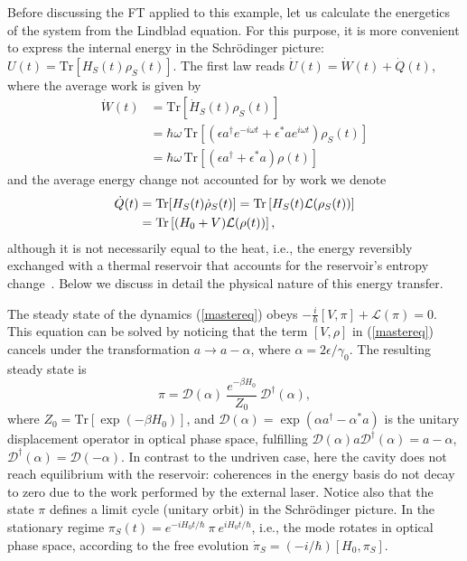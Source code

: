 \documentclass[aps,prx,twocolumn,showpacs,floatfix,superscriptaddress,graphics,longbibliography]{revtex4-1}
\newcommand{\tr}{\mathrm{Tr}}
\begin{document}
Before discussing the FT applied to this example, let us calculate the energetics of the system from the Lindblad equation. For this purpose, it is more convenient to express the internal energy in the Schr\"odinger picture: $U(t)=\tr[H_S(t)\rho_S(t)]$. The first law reads $\dot U(t)=\dot W(t)+\dot Q(t)$, where the average work is given by 
\begin{align}
\dot{W}(t) &= \tr[\dot{H}_S(t) \rho_S(t)] \nonumber \\ 
 & = \hbar\omega \, \tr\left[ \left(\epsilon  a^\dagger e^{-i\omega t} + \epsilon^*ae^{i\omega t} \right)\rho_S(t)\right] \nonumber \\
& = \hbar\omega\, \tr\left[ \left(\epsilon  a^\dagger  + \epsilon^*a \right)\rho(t)\right]
\end{align}
and the average energy change not accounted for by work we denote
\begin{align}
\dot{Q}(t) & =  \tr[H_S(t) \dot\rho_S(t)]= \tr\left[H_S(t){\cal L}(\rho_S(t))\right] \nonumber \\
& = \tr\left[(H_0+V){\cal L}(\rho(t))\right],\label{q3}
\end{align}
although it is not necessarily equal to the heat, i.e., the energy reversibly exchanged with a thermal reservoir that accounts for the reservoir's entropy change~\cite{Horowitz2016}.
Below we discuss in detail the physical nature of this energy transfer. 

The steady state of the dynamics (\ref{mastereq}) obeys $- \frac{i}{\hbar}[V, \pi ] + \mathcal{L}(\pi) = 0$. This equation can be solved by noticing that the term $[V,\rho]$ in (\ref{mastereq}) 
cancels under the transformation $a \rightarrow a - \alpha$, where $\alpha = 2 \epsilon/\gamma_0$. The resulting steady state is
\begin{equation} \label{ssi}
\pi = \mathcal{D}(\alpha) ~\frac{e^{- \beta H_0}}{Z_0} ~\mathcal{D}^\dagger(\alpha), 
\end{equation}
where $Z_0 = \tr[\exp(-\beta H_0)]$, and $\mathcal{D}(\alpha) = \exp(\alpha a^\dagger - \alpha^\ast a)$ is the unitary displacement operator in optical phase space, fulfilling 
$\mathcal{D}(\alpha) a \mathcal{D}^\dagger(\alpha) = a - \alpha$, $\mathcal{D}^\dagger(\alpha) = \mathcal{D}(-\alpha)$. 
In contrast to the undriven case, here the cavity does not reach equilibrium 
with the reservoir: coherences in the energy basis do not decay to zero due to the work performed by the external laser. Notice also that the state $\pi$ 
defines a limit cycle (unitary orbit) in the Schr\"odinger picture. In the stationary regime $\pi_S(t) =e^{-i H_0 t/	\hbar}~\pi~ e^{i H_0 t/\hbar}$, i.e., the mode rotates in optical phase space, according to the free evolution 
$\dot{\pi}_S = (-i/\hbar)[H_0, \pi_S]$.
\end{document}
